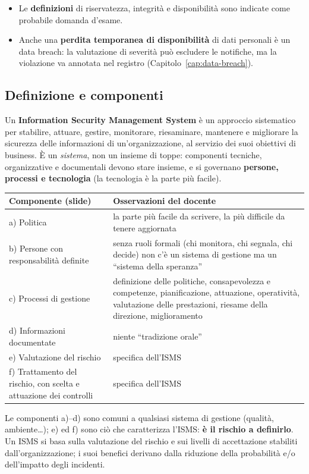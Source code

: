 \begin{esame}
\begin{itemize}
  \item Le \textbf{definizioni} di riservatezza, integrità e disponibilità sono indicate come probabile
    domanda d'esame.
  \item Anche una \textbf{perdita temporanea di disponibilità} di dati personali è un data breach: la
    valutazione di severità può escludere le notifiche, ma la violazione va annotata nel registro
    (Capitolo~\ref{cap:data-breach}).
\end{itemize}
\end{esame}

\subsection{Definizione e componenti}
Un \textbf{Information Security Management System} è un approccio sistematico per stabilire, attuare,
gestire, monitorare, riesaminare, mantenere e migliorare la sicurezza delle informazioni di
un'organizzazione, al servizio dei suoi obiettivi di business. È un \emph{sistema}, non un insieme di
toppe: componenti tecniche, organizzative e documentali devono stare insieme, e si governano
\textbf{persone, processi e tecnologia} (la tecnologia è la parte più facile).

\begin{center}
\small
\begin{tabularx}{\linewidth}{>{\raggedright\arraybackslash}p{4.4cm} X}
\toprule
\textbf{Componente (slide)} & \textbf{Osservazioni del docente}\\
\midrule
a) Politica & la parte più facile da scrivere, la più difficile da tenere aggiornata\\
b) Persone con responsabilità definite & senza ruoli formali (chi monitora, chi segnala, chi decide) non c'è
  un sistema di gestione ma un ``sistema della speranza''\\
c) Processi di gestione & definizione delle politiche, consapevolezza e competenze, pianificazione,
  attuazione, operatività, valutazione delle prestazioni, riesame della direzione, miglioramento\\
d) Informazioni documentate & niente ``tradizione orale''\\
e) Valutazione del rischio & specifica dell'ISMS\\
f) Trattamento del rischio, con scelta e attuazione dei controlli & specifica dell'ISMS\\
\bottomrule
\end{tabularx}
\end{center}
Le componenti a)--d) sono comuni a qualsiasi sistema di gestione (qualità, ambiente\ldots); e) ed f) sono ciò
che caratterizza l'ISMS: \textbf{è il rischio a definirlo}. Un ISMS si basa sulla valutazione del rischio e
sui livelli di accettazione stabiliti dall'organizzazione; i suoi benefici derivano dalla riduzione della
probabilità e/o dell'impatto degli incidenti.

